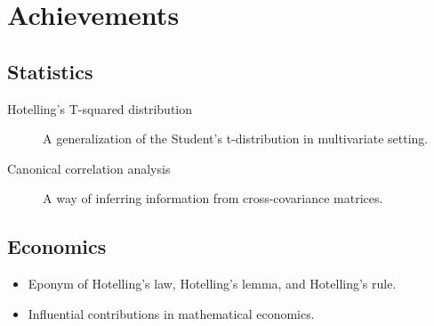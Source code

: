 \documentclass{resume}
\begin{document}
\section{Achievements}

\subsection{Statistics}

\begin{description}
\item[Hotelling's T-squared distribution] A generalization of the Student's
  t-distribution in multivariate setting.
\item[Canonical correlation analysis] A way of inferring information from
  cross-covariance matrices.
\end{description}

\subsection{Economics}

\begin{itemize}
\item Eponym of Hotelling's law, Hotelling's lemma, and Hotelling's rule.
\item Influential contributions in mathematical economics.
\end{itemize}
\end{document}
